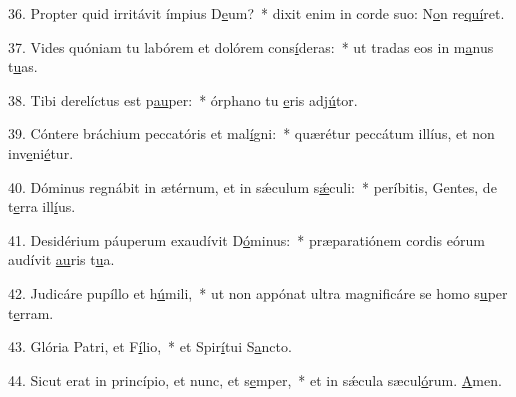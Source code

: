 36. Propter quid irritávit ímpius D\uline{e}um?~* dixit enim in corde suo: N\uline{o}n re\uline{quí}ret.\par 
37. Vides quóniam tu labórem et dolórem cons\uline{í}deras:~* ut tradas eos in m\uline{a}nus t\uline{u}as.\par 
38. Tibi derelíctus est p\uline{au}per:~* órphano tu \uline{e}ris adj\uline{ú}tor.\par 
39. Cóntere bráchium peccatóris et mal\uline{í}gni:~* quærétur peccátum illíus, et non inv\uline{e}ni\uline{é}tur.\par 
40. Dóminus regnábit in ætérnum, et in sǽculum s\uline{ǽ}culi:~* períbitis, Gentes, de t\uline{e}rra ill\uline{í}us.\par 
41. Desidérium páuperum exaudívit D\uline{ó}minus:~* præparatiónem cordis eórum audívit \uline{au}ris t\uline{u}a.\par 
42. Judicáre pupíllo et h\uline{ú}mili,~* ut non appónat ultra magnificáre se homo s\uline{u}per t\uline{e}rram.\par 
43. Glória Patri, et F\uline{í}lio,~* et Spir\uline{í}tui S\uline{a}ncto.\par 
44. Sicut erat in princípio, et nunc, et s\uline{e}mper,~* et in sǽcula sæcul\uline{ó}rum. \uline{A}men.\par 
